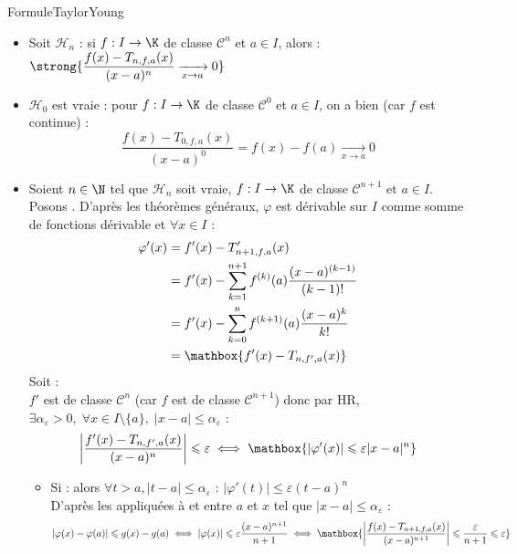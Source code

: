 \documentclass[12pt,a4paper]{report}
\begin{document}
\begin{demonstration}{FormuleTaylorYoung}
    \begin{itemize}[leftmargin=0.5cm]
        \item Soit $\mathcal{H}_n$ : si $f : I \to \K$ de classe $\mathcal{C}^n$ et $a \in I$, alors : $ \strong{\dfrac{f(x) - T_{n,f,a}(x)}{(x-a)^n} \xrightarrow[x \to a]{} 0} $
        \item $\mathcal{H}_0$ est vraie : pour $f : I \to \K$ de classe $\mathcal{C}^0$ et $a \in I$, on a bien (car $f$ est continue) : 
        $$ \dfrac{f(x) - T_{0,f,a}(x)}{(x-a)^0} = f(x) - f(a) \xrightarrow[x \to a]{} 0 $$
        \item Soient $n \in \N$ tel que $\mathcal{H}_n$ soit vraie, $f : I \to \K$ de classe $\mathcal{C}^{n+1}$ et $a \in I$.\\
        Posons . D'après les théorèmes généraux, $\varphi$ est dérivable sur $I$ comme somme de fonctions dérivable et $\forall x \in I$ :
        \begin{align*}
            \varphi'(x) &= f'(x) - T'_{n+1,f,a}(x) \\
            &= f'(x) - \sum_{k=1}^{n+1} f^{(k)}(a) \dfrac{(x-a)^{(k-1)}}{(k-1)!} \\
            &= f'(x) - \sum_{k=0}^{n} f^{(k+1)}(a) \dfrac{(x-a)^k}{k!} \\
            &= \mathbox{f'(x) - T_{n,f',a}(x)}
        \end{align*}
        Soit  :\\
        $f'$ est de classe $\mathcal{C}^n$ (car $f$ est de classe $\mathcal{C}^{n+1}$) donc par HR, $\exists \alpha_\varepsilon > 0, \; \forall x \in I\setminus\{a\}, \; |x-a| \leqslant \alpha_\varepsilon $ :
        $$ \left| \dfrac{f'(x) - T_{n,f',a}(x)}{(x-a)^n} \right| \leqslant \varepsilon \; \Longleftrightarrow \; \mathbox{|\varphi'(x)| \leqslant \varepsilon |x-a|^n} $$
        \begin{itemize}
            \item Si  : alors $\forall t > a, |t-a| \leqslant \alpha_\varepsilon$ : $|\varphi'(t)| \leqslant \varepsilon(t-a)^n$\\
            D'après les  appliquées à \strong{$\varphi$} et  entre $a$ et $x$ tel que $|x-a| \leqslant \alpha_\varepsilon$ :
            $$ |\varphi(x) - \varphi(a)| \leqslant g(x) - g(a) \; \Longleftrightarrow \; |\varphi(x)| \leqslant \varepsilon \dfrac{(x-a)^{n+1}}{n+1} \; \Longleftrightarrow \; \mathbox{\left| \dfrac{f(x) - T_{n+1,f,a}(x)}{(x-a)^{n+1}} \right| \leqslant \dfrac{\varepsilon}{n+1} \leqslant \varepsilon} $$

\end{itemize}
\end{itemize}
\end{demonstration}
\end{document}
